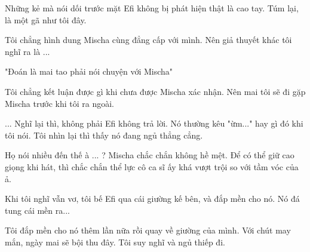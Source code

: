 Những kẻ mà nói dối trước mặt Efi không bị phát hiện thật là cao tay. Túm lại, là một gã như tôi đây.

Tôi chẳng hình dung Mischa cùng đẳng cấp với mình. Nên giả thuyết khác tôi nghĩ ra là ...

"Đoán là mai tao phải nói chuyện với Mischa"

Tôi chẳng kết luận được gì khi chưa được Mischa xác nhận. Nên mai tôi sẽ đi gặp Mischa trước khi tôi ra ngoài.

... Nghĩ lại thì, không phải Efi không trả lời. Nó thường kêu "ừm..." hay gì đó khi tôi nói. Tôi nhìn lại thì thấy nó đang ngủ thẳng cẳng.

Họ nói nhiều đến thế à ... ? Mischa chắc chắn không hề mệt. Để có thể giữ cao giọng khi hát, thì chắc chắn thể lực cô ca sĩ ấy khá vượt trội so với tầm vóc của ả. 

Khi tôi nghĩ vẫn vơ, tôi bế Efi qua cái giường kế bên, và đắp mền cho nó. Nó đá tung cái mền ra...

Tôi đắp mền cho nó thêm lần nữa rồi quay về giường của mình. Với chút may mắn, ngày mai sẽ bội thu đây. Tôi suy nghĩ và ngủ thiếp đi.\\

